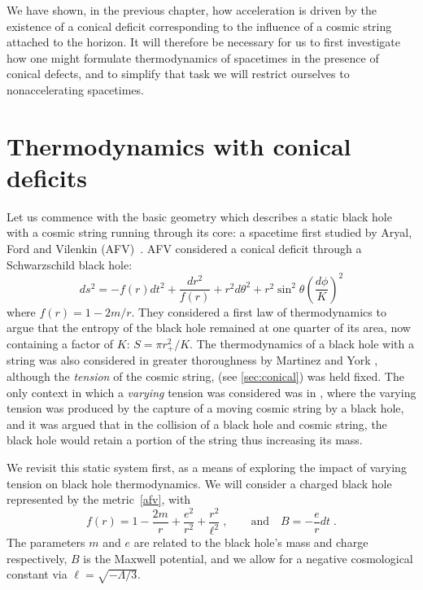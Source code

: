\documentclass[
twoside,
openright,
frontopenright,
]{dmathesis}
\begin{document}
We have shown, in the previous chapter, how acceleration is driven by the
existence of a conical deficit corresponding to the influence of a cosmic string
attached to the horizon. It will therefore be necessary for us to first
investigate how one might formulate thermodynamics of spacetimes in the presence
of conical defects, and to simplify that task we will restrict ourselves to
nonaccelerating spacetimes.

\section{Thermodynamics with conical deficits}\label{sec:singlemu}

Let us commence with the basic geometry which describes a static black hole with
a cosmic string running through its core: a spacetime first studied by Aryal,
Ford and Vilenkin (AFV)~\cite{Aryal:1986sz}. AFV considered a conical deficit
through a Schwarzschild black hole:
\begin{equation}
ds^2 = - f(r) dt^2 + \frac{dr^2}{f(r)} + r^2 d\theta^2
+ r^2 \sin^2\theta \left (\frac{d\phi}{K}\right ) ^2
\label{afv}
\end{equation}
where $f(r) = 1 -2m/r$. They considered a first law of thermodynamics to argue
that the entropy of the black hole remained at one quarter of its area, now
containing a factor of $K$: $S = \pi r_+^2/K$. The thermodynamics of a black
hole with a string was also considered in greater thoroughness by Martinez and
York \cite{Martinez:1990sd}, although the \emph{tension} of the cosmic string,
(see \cref{sec:conical}) was held fixed. The only context in which a
\emph{varying} tension was considered was in \cite{Bonjour:1998rf}, where the
varying tension was produced by the capture of a moving cosmic string by a black
hole, and it was argued that in the collision of a black hole and cosmic string,
the black hole would retain a portion of the string thus increasing its mass.

We revisit this static system first, as a means of exploring the impact of
varying tension on black hole thermodynamics. We will consider a charged black
hole represented by the metric~\eqref{afv}, with
\begin{equation}
f(r) = 1-\frac{2m}{r} + \frac{e^{2}}{r^{2}} + \frac{r^{2}}{\ell^2}\;, \qquad
\text{and} \quad {B} = - \frac{e}{r} dt\;.
\end{equation}
The parameters $m$ and $e$ are related to the black hole's mass and charge
respectively, $B$ is the Maxwell potential, and we allow for a negative
cosmological constant via $\ell = \sqrt{-\Lambda/3}$.
\end{document}
